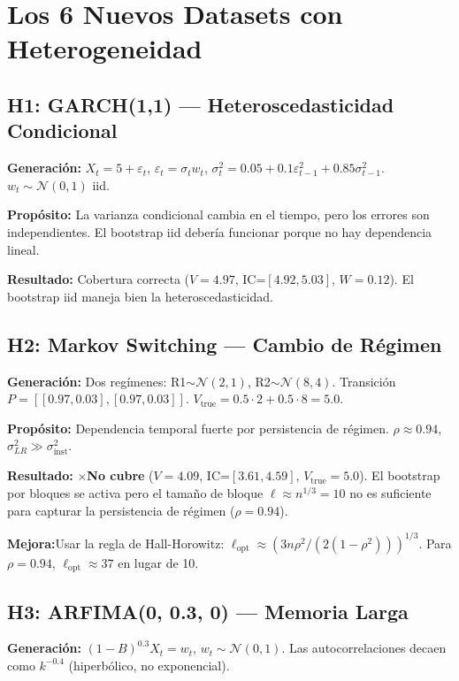 \documentclass[12pt,a4paper]{article}
\newcommand{\ok}{\textcolor{cbgreen}{\checkmark}}
\newcommand{\fail}{\textcolor{cbred}{$\times$}}
\newcommand{\mejora}{\textbf{Mejora:}}
\begin{document}
\newpage

\section{Los 6 Nuevos Datasets con Heterogeneidad}

\subsection{H1: GARCH(1,1) — Heteroscedasticidad Condicional}

\textbf{Generación:} $X_t = 5 + \varepsilon_t$, $\varepsilon_t = \sigma_t w_t$, $\sigma^2_t = 0.05 + 0.1\varepsilon^2_{t-1} + 0.85\sigma^2_{t-1}$. $w_t \sim \mathcal{N}(0,1)$ iid.

\textbf{Propósito:} La varianza condicional cambia en el tiempo, pero los errores son independientes. El bootstrap iid debería funcionar porque no hay dependencia lineal.

\textbf{Resultado:} \ok Cobertura correcta ($V=4.97$, IC=$[4.92,5.03]$, $W=0.12$). El bootstrap iid maneja bien la heteroscedasticidad.

\subsection{H2: Markov Switching — Cambio de Régimen}

\textbf{Generación:} Dos regímenes: R1$\sim\mathcal{N}(2,1)$, R2$\sim\mathcal{N}(8,4)$. Transición $P = [[0.97,0.03],[0.97,0.03]]$. $V_{\text{true}} = 0.5\cdot2 + 0.5\cdot8 = 5.0$.

\textbf{Propósito:} Dependencia temporal fuerte por persistencia de régimen. $\rho \approx 0.94$, $\sigma^2_{LR} \gg \sigma^2_{\text{inst}}$.

\textbf{Resultado:} \fail \textbf{No cubre} ($V=4.09$, IC=$[3.61,4.59]$, $V_{\text{true}}=5.0$). El bootstrap por bloques se activa pero el tamaño de bloque $\ell \approx n^{1/3} = 10$ no es suficiente para capturar la persistencia de régimen ($\rho=0.94$).

\mejora Usar la regla de Hall-Horowitz: $\ell_{\text{opt}} \approx (3n\rho^2/(2(1-\rho^2)))^{1/3}$. Para $\rho=0.94$, $\ell_{\text{opt}} \approx 37$ en lugar de 10.

\subsection{H3: ARFIMA(0, 0.3, 0) — Memoria Larga}

\textbf{Generación:} $(1-B)^{0.3}X_t = w_t$, $w_t\sim\mathcal{N}(0,1)$. Las autocorrelaciones decaen como $k^{-0.4}$ (hiperbólico, no exponencial).
\end{document}

